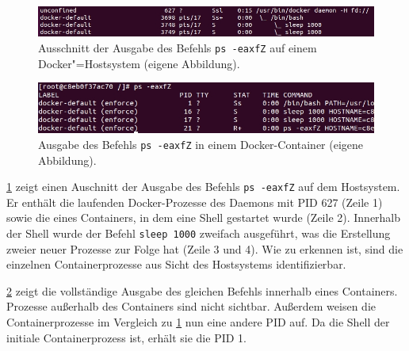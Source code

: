 \documentclass[../main.tex]{subfiles}
\begin{document}
			\begin{figure}[h]
					\centering
					\includegraphics[width=1.0\textwidth]{./images/sec_pidNsHost.jpg}
					\caption{Ausschnitt der Ausgabe des Befehls \texttt{ps -eaxfZ} auf einem Docker"=Hostsystem (eigene Abbildung).}
					\label{fig:sec_pidNsHost}
			\end{figure}

			\begin{figure}[h]
					\centering
					\includegraphics[width=1.0\textwidth]{./images/sec_pidNsContainer.jpg}
					\caption{Ausgabe des Befehls \texttt{ps -eaxfZ} in einem Docker-Container (eigene Abbildung).}
					\label{fig:sec_pidNsContainer}
			\end{figure}

			\fig \ref{fig:sec_pidNsHost} zeigt einen Auschnitt der Ausgabe des Befehls \texttt{ps -eaxfZ} auf dem Hostsystem. Er enthält die laufenden Docker-Prozesse des Daemons mit PID 627 (Zeile 1) sowie die eines Containers, in dem eine Shell gestartet wurde (Zeile 2). Innerhalb der Shell wurde der Befehl \texttt{sleep 1000} zweifach ausgeführt, was die Erstellung zweier neuer Prozesse zur Folge hat (Zeile 3 und 4). Wie zu erkennen ist, sind die einzelnen Containerprozesse aus Sicht des Hostsystems identifizierbar.


			\fig \ref{fig:sec_pidNsContainer} zeigt die vollständige Ausgabe des gleichen Befehls innerhalb eines Containers. Prozesse außerhalb des Containers sind nicht sichtbar. Außerdem weisen die Containerprozesse im Vergleich zu \fig \ref{fig:sec_pidNsHost} nun eine andere PID auf. Da die Shell der initiale Containerprozess ist, erhält sie die PID 1.

\end{document}
